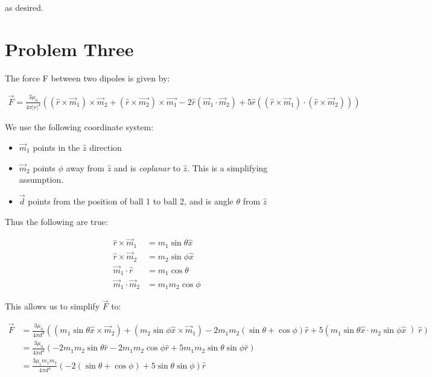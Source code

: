 \documentclass[10pt]{article} %
\begin{document}
as desired.

\section{Problem Three}
The force F between two dipoles is given by:

\begin{align*}
  \vec{F} = \frac{3\mu_0}{4\pi |r|^4}((\hat{r} \times \vec{m}_1) \times \vec{m}_2 + (\hat{r} \times \vec{m_2}) \times \vec{m_1}
  - 2\hat{r}(\vec{m}_1 \cdot \vec{m}_2) + 5\hat{r}((\hat{r} \times \vec{m}_1) \cdot (\hat{r} \times \vec{m}_2)))
\end{align*}

We use the following coordinate system:

\begin{itemize}
\item $\vec{m}_1$ points in the $\hat{z}$ direction
\item $\vec{m}_2$ points $\phi$ away from $\hat{z}$ and is \textit{coplanar} to $\hat{z}$. This is a simplifying assumption.
\item $\vec{d}$ points from the position of ball 1 to ball 2, and is angle $\theta$ from $\hat{z}$
\end{itemize}

Thus the following are true:

\begin{align*}
  \hat{r} \times \vec{m}_1 &= m_1\sin\theta\hat{x}\\
  \hat{r} \times \vec{m}_2 &= m_2\sin\phi\hat{x}\\
  \vec{m}_1 \cdot \hat{r} &= m_1\cos\theta\\
  \vec{m}_1 \cdot \vec{m}_2 &= m_1m_2\cos\phi
\end{align*}

This allows us to simplify $\vec{F}$ to:

\begin{align*}
  \vec{F} &= \frac{3\mu_0}{4\pi d^4} \left(\left(m_1\sin\theta\hat{x} \times \vec{m}_2\right)
  + \left(m_2\sin\phi\hat{x} \times \vec{m}_1\right)
  - 2m_1m_2\left(\sin\theta + \cos\phi\right)\hat{r} + 5\left(m_1\sin\theta\hat{x} \cdot m_2\sin\phi\hat{x}\left)\hat{r}
  \right)\\
  &= \frac{3\mu_0}{4\pi d^4} \left(-2m_1m_2\sin\theta\hat{r} - 2m_1m_2\cos\phi\hat{r} + 5m_1m_2\sin\theta\sin\phi\hat{r}\right)\\
  &= \frac{3\mu_1m_1m_2}{4\pi d^4}\left(-2\left(\sin\theta+\cos\phi\right) + 5\sin\theta\sin\phi\right)\hat{r}
\end{align*}
\end{document}
